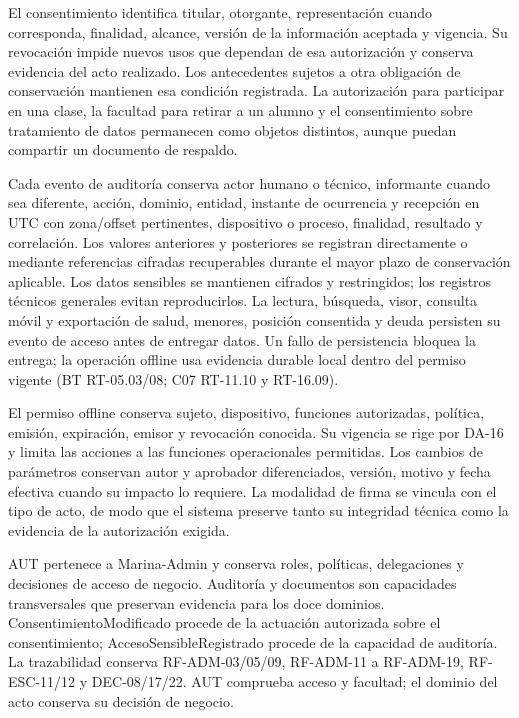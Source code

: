 El consentimiento identifica titular, otorgante, representación cuando corresponda, finalidad, alcance, versión de la información aceptada y vigencia. Su revocación impide nuevos usos que dependan de esa autorización y conserva evidencia del acto realizado. Los antecedentes sujetos a otra obligación de conservación mantienen esa condición registrada. La autorización para participar en una clase, la facultad para retirar a un alumno y el consentimiento sobre tratamiento de datos permanecen como objetos distintos, aunque puedan compartir un documento de respaldo.

Cada evento de auditoría conserva actor humano o técnico, informante cuando sea diferente, acción, dominio, entidad, instante de ocurrencia y recepción en UTC con zona/offset pertinentes, dispositivo o proceso, finalidad, resultado y correlación. Los valores anteriores y posteriores se registran directamente o mediante referencias cifradas recuperables durante el mayor plazo de conservación aplicable. Los datos sensibles se mantienen cifrados y restringidos; los registros técnicos generales evitan reproducirlos. La lectura, búsqueda, visor, consulta móvil y exportación de salud, menores, posición consentida y deuda persisten su evento de acceso antes de entregar datos. Un fallo de persistencia bloquea la entrega; la operación offline usa evidencia durable local dentro del permiso vigente (BT RT-05.03/08; C07 RT-11.10 y RT-16.09).

El permiso offline conserva sujeto, dispositivo, funciones autorizadas, política, emisión, expiración, emisor y revocación conocida. Su vigencia se rige por DA-16 y limita las acciones a las funciones operacionales permitidas. Los cambios de parámetros conservan autor y aprobador diferenciados, versión, motivo y fecha efectiva cuando su impacto lo requiere. La modalidad de firma se vincula con el tipo de acto, de modo que el sistema preserve tanto su integridad técnica como la evidencia de la autorización exigida.


AUT pertenece a Marina-Admin y conserva roles, políticas, delegaciones y decisiones de acceso de negocio. Auditoría y documentos son capacidades transversales que preservan evidencia para los doce dominios. ConsentimientoModificado procede de la actuación autorizada sobre el consentimiento; AccesoSensibleRegistrado procede de la capacidad de auditoría. La trazabilidad conserva RF-ADM-03/05/09, RF-ADM-11 a RF-ADM-19, RF-ESC-11/12 y DEC-08/17/22. AUT comprueba acceso y facultad; el dominio del acto conserva su decisión de negocio.

